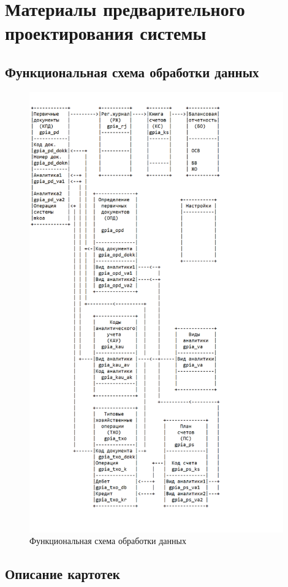 \section{Материалы предварительного проектирования системы}
\subsection{Функциональная схема обработки данных}

\begin{figure}[!htb]
    \centering
    \includegraphics[height=19cm]
        {_assets/gpia_part2.png}
    \caption{Функциональная схема обработки данных}
\end{figure}

\subsection{Описание картотек}

